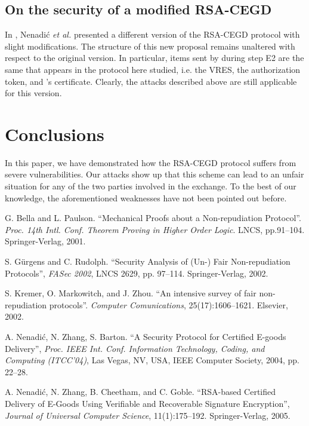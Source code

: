 \documentclass{article}
\begin{document}
{\subsection{On the security of a modified RSA-CEGD}\label{Sec:OtherVersion}
In \cite{NZCG05}, Nenadi\'c \emph{et al.} presented a different
version of the RSA-CEGD protocol with slight modifications. The
structure of this new proposal remains unaltered with respect to the
original version. In particular, items sent by  during step E2
are the same that appears in the protocol here studied, i.e. the
VRES, the authorization token, and 's certificate. Clearly, the
attacks described above are still applicable for this version.


\section{Conclusions}\label{Sec:Conclusions}
In this paper, we have demonstrated how the RSA-CEGD protocol
suffers from severe vulnerabilities. Our attacks show up that this
scheme can lead to an unfair situation for any of the two parties
involved in the exchange. To the best of our knowledge, the
aforementioned weaknesses have not been pointed out before.


\begin{thebibliography}{99}


G. Bella and L. Paulson. ``Mechanical Proofs about a Non-repudiation
Protocol''. \textit{Proc. 14th Intl. Conf. Theorem Proving in Higher
Order Logic}. LNCS, pp.91--104. Springer-Verlag, 2001.

S. G\"urgens and C. Rudolph. ``Security Analysis of (Un-) Fair
Non-repudiation Protocols'', \textit{FASec 2002}, LNCS 2629, pp.
97--114. Springer-Verlag, 2002.

S. Kremer, O. Markowitch, and J. Zhou. ``An intensive survey of fair
non-repudiation protocols''. \textit{Computer Comunications},
25(17):1606--1621. Elsevier, 2002.

A. Nenadi\'c, N. Zhang, S. Barton. ``A Security Protocol for
Certified E-goods Delivery'', \textit{Proc. IEEE Int. Conf.
Information Technology, Coding, and Computing (ITCC'04)}, Las Vegas,
NV, USA, IEEE Computer Society, 2004, pp. 22--28.

A. Nenadi\'c, N. Zhang, B. Cheetham, and C. Goble. ``RSA-based
Certified Delivery of E-Goods Using Verifiable and Recoverable
Signature Encryption'', \textit{Journal of Universal Computer
Science}, 11(1):175--192. Springer-Verlag, 2005.


\end{thebibliography}}
\end{document}
